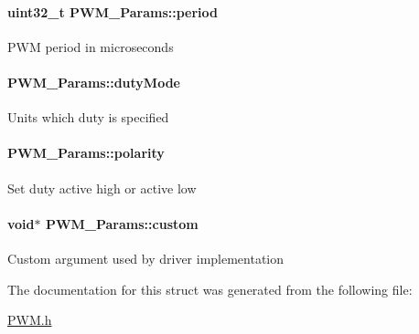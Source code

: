 \paragraph[{period}]{\setlength{\rightskip}{0pt plus 5cm}uint32\+\_\+t P\+W\+M\+\_\+\+Params\+::period}\label{struct_p_w_m___params_a6c88aaea599f9584db7b56fb2b1045f7}
P\+W\+M period in microseconds 
\paragraph[{duty\+Mode}]{ P\+W\+M\+\_\+\+Params\+::duty\+Mode}\label{struct_p_w_m___params_ab054d20d938b0a6a2c93e1470aa42d15}
Units which duty is specified 
\paragraph[{polarity}]{ P\+W\+M\+\_\+\+Params\+::polarity}\label{struct_p_w_m___params_ab8a3786f6ac3ca5306b9c57ba6fccede}
Set duty active high or active low 
\paragraph[{custom}]{\setlength{\rightskip}{0pt plus 5cm}void$\ast$ P\+W\+M\+\_\+\+Params\+::custom}\label{struct_p_w_m___params_a37396e0fa9aac45d2a8292cf5d653471}
Custom argument used by driver implementation 

The documentation for this struct was generated from the following file\+:\begin{DoxyCompactItemize}
\item 
\hyperlink{_p_w_m_8h}{P\+W\+M.\+h}\end{DoxyCompactItemize}
